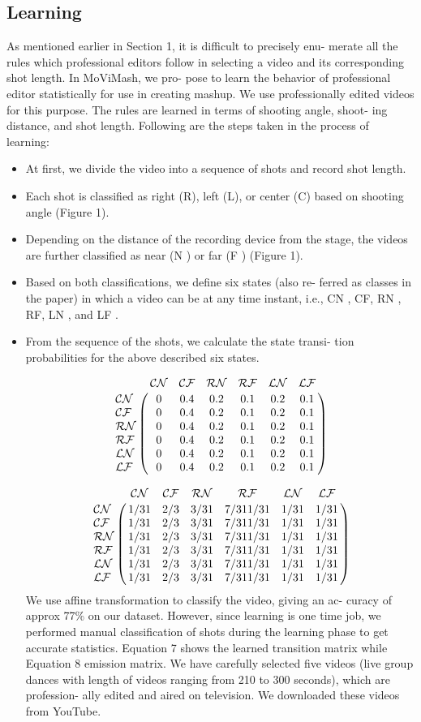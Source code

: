 \documentclass{sig-alternate-05-2015}
\begin{document}
\subsection{Learning}
As mentioned earlier in Section 1, it is difficult to precisely enu-
merate all the rules which professional editors follow in selecting
a video and its corresponding shot length. In MoViMash, we pro-
pose to learn the behavior of professional editor statistically for use
in creating mashup. We use professionally edited videos for this
purpose. The rules are learned in terms of shooting angle, shoot-
ing distance, and shot length. Following are the steps taken in the
process of learning:
\begin{itemize}
\item At first, we divide the video into a sequence of shots and
record shot length.
\item Each shot is classified as right (R), left (L), or center (C)
based on shooting angle (Figure 1).
\item Depending on the distance of the recording device from the
stage, the videos are further classified as near (N ) or far (F )
(Figure 1).
\item Based on both classifications, we define six states (also re-
ferred as classes in the paper) in which a video can be at any
time instant, i.e., CN , CF, RN , RF, LN , and LF .
\item From the sequence of the shots, we calculate the state transi-
tion probabilities for the above described six states.


$$
\bordermatrix{~ &\mathcal{CN} & \mathcal{CF}& \mathcal{RN}& \mathcal{RF}& \mathcal{LN}&\mathcal{LF} \cr
  \mathcal{CN} &0& 0.4& 0.2 &0.1& 0.2& 0.1 \cr
  \mathcal{CF}  &0& 0.4& 0.2 &0.1& 0.2& 0.1 \cr
  \mathcal{RN}  &0& 0.4& 0.2 &0.1& 0.2& 0.1 \cr
  \mathcal{RF}  &0& 0.4& 0.2 &0.1& 0.2& 0.1 \cr
  \mathcal{LN}  &0& 0.4& 0.2 &0.1& 0.2& 0.1 \cr
  \mathcal{LF}  &0& 0.4& 0.2 &0.1& 0.2& 0.1 \cr
  }
$$

$$
\bordermatrix{~ & \mathcal{CN} & \mathcal{CF}& \mathcal{RN}& \mathcal{RF}& \mathcal{LN}&\mathcal{LF} \cr
  \mathcal{CN} & 1/31 & 2/3& 3/31 &7/311/31&1/31&1/31\cr
  \mathcal{CF} &1/31 & 2/3& 3/31 &7/311/31&1/31&1/31 \cr
  \mathcal{RN} &1/31 & 2/3& 3/31 &7/311/31&1/31&1/31\cr
  \mathcal{RF} &1/31 & 2/3& 3/31 &7/311/31&1/31&1/31\cr
  \mathcal{LN} &1/31 & 2/3& 3/31 &7/311/31&1/31&1/31 \cr
  \mathcal{LF} &1/31 & 2/3& 3/31 &7/311/31&1/31&1/31 \cr
  }
$$
We use affine transformation to classify the video, giving an ac-
curacy of approx 77\% on our dataset. However, since learning is one
time job, we performed manual classification of shots during the
learning phase to get accurate statistics. Equation 7 shows the
learned transition matrix while Equation 8 emission matrix. We
have carefully selected five videos (live group dances with length
of videos ranging from 210 to 300 seconds), which are profession-
ally edited and aired on television. We downloaded these videos
from YouTube.


\end{itemize}
\end{document}
